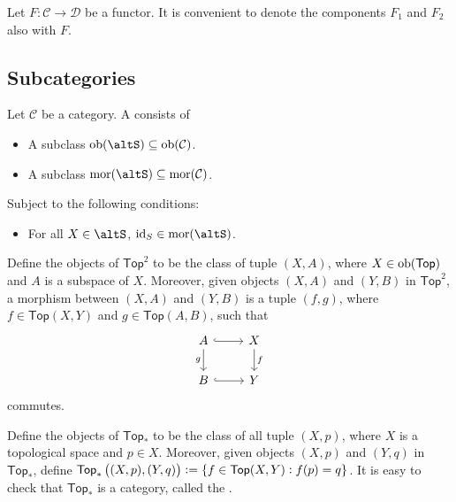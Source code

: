 \begin{remark}
	Let $F : \mathcal{C} \to \mathcal{D}$ be a functor. It is convenient to denote the components $F_1$ and $F_2$ also with $F$.
\end{remark}

\subsection*{Subcategories}
\begin{definition}[Subcategory]
	Let $\mathcal{C}$ be a category. A  consists of
	\begin{itemize}[leftmargin = *]
		\item A subclass $\ob(\mathcal{\altS}) \subseteq \ob(\mathcal{C})$.
		\item A subclass $\mor(\mathcal{\altS}) \subseteq \mor(\mathcal{C})$.
	\end{itemize}
	Subject to the following conditions:
	\begin{itemize}[leftmargin = *]
		\item For all $X \in \mathcal{\altS}$, $\id_S \in \mor(\mathcal{\altS})$.
	\end{itemize}
\end{definition}

\begin{example}
	Define the objects of $\mathsf{Top}^2$ to be the class of tuple $(X,A)$, where $X \in \operatorname{ob}(\mathsf{Top})$ and $A$ is a subspace of $X$. Moreover, given objects $(X,A)$ and $(Y,B)$ in $\mathsf{Top}^2$, a morphism between $(X,A)$ and $(Y,B)$ is a tuple $(f,g)$, where $f \in \mathsf{Top}(X,Y)$ and $g \in \mathsf{Top}(A,B)$, such that 
	\begin{equation*}
		\begin{tikzcd}
			A \arrow[r,hook]\arrow[d,"g"'] & X \arrow[d,"f"]\\
			B \arrow[r,hook] & Y
		\end{tikzcd}
	\end{equation*}
	\noindent commutes.
\end{example}

\begin{example}
	Define the objects of $\mathsf{Top}_\ast$ to be the class of all tuple $(X,p)$, where $X$ is a topological space and $p \in X$. Moreover, given objects $(X,p)$ and $(Y,q)$ in $\mathsf{Top}_\ast$, define $\mathsf{Top}_\ast\del[1]{(X,p),(Y,q)} := \cbr[0]{f \in \mathsf{Top}(X,Y) : f(p) = q}$. It is easy to check that $\mathsf{Top}_\ast$ is a category, called the .

\end{example}

